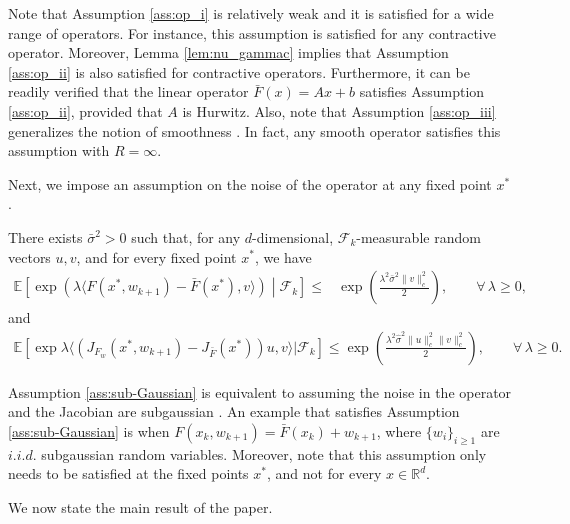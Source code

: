 \documentclass[letterpaper, 10 pt]{article}
\newcommand{\E}{\mathbb{E}}
\begin{document}
Note that Assumption \ref{ass:op_i} is relatively weak and it is satisfied for a wide range of operators. For instance, this assumption is satisfied for any contractive operator. Moreover, Lemma \ref{lem:nu_gammac} implies that  Assumption \ref{ass:op_ii} is also satisfied for contractive operators. Furthermore, it can be readily verified that the linear operator $\bar{F}(x) = Ax + b$ satisfies Assumption \ref{ass:op_ii}, provided that $A$ is Hurwitz. Also, note that Assumption \ref{ass:op_iii} generalizes the notion of smoothness \cite{beck2017first}. In fact, any smooth operator satisfies this assumption with $R=\infty$.

\smallskip

Next, we impose an assumption on the noise of the operator at any fixed point $x^*$. 


\begin{assumption}\label{ass:sub-Gaussian}
There exists $\bar{\sigma}^2 >0$ such that, for any $d$-dimensional, $\mathcal{F}_k$-measurable random vectors $u,v$, and for every fixed point $x^*$, we have
\begin{align}
       \mathbb{E} \left[\exp\left(\lambda \langle F(x^*,w_{k+1}) - \bar{F}(x^*), v \rangle \right) \middle| \mathcal{F}_k \right] \leq& \exp\left(\frac{\lambda^2\bar{\sigma}^2  \|v\|_{c}^2}{2}\right), \qquad \forall\, \lambda \geq 0, \label{eq:sub-Gaussian_11}
    \end{align}
and
    \begin{align} \label{eq:sub_gaussian_ass}
        \E[ \exp \lambda \langle(J_{F_{w}}(x^*, w_{k+1})- J_{\bar{F}}(x^*))u, v\rangle|\mathcal{F}_k] \leq \exp\left(\frac{\lambda^2\hat{\sigma}^2\|u\|^2_{c}\|v\|^2_{c}}{2}\right), \qquad \forall \, \lambda \geq 0.
    \end{align}
\end{assumption}

\begin{remark}
Assumption \ref{ass:sub-Gaussian} is equivalent to assuming the noise in the operator and the Jacobian are subgaussian \cite{Wainwright2019}. An example that satisfies Assumption \ref{ass:sub-Gaussian} is when $F(x_k,w_{k+1}) = \bar{F}(x_k)+w_{k+1}$, where $\{w_i\}_{i\geq 1}$ are $i.i.d.$ subgaussian random variables. Moreover, note that this assumption only needs to be satisfied at the fixed points $x^*$, and not for every $x\in\mathbb{R}^d$. 
\end{remark}

We now state the main result of the paper.
\end{document}
